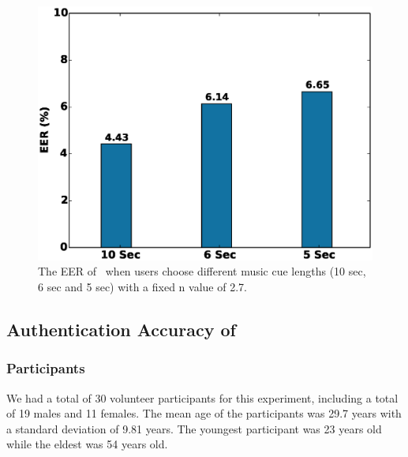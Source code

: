 
\begin{figure}[t]
\centering
\includegraphics [width=.75\columnwidth]{figure/exp2_eer_vary_length.eps}
\caption{The EER of \systemname~when users choose different music cue lengths (10 sec, 6 sec and 5
sec) with a fixed n value of 2.7.}
\label{fig:eer-length}
\vspace{-1mm}
\end{figure}




\subsection{Authentication Accuracy of \systemname}

\subsubsection{Participants}
We had a total of 30 volunteer participants for this experiment, including a total of 19 males and 11 females.
The mean age of the participants was 29.7 years with a standard deviation
of 9.81 years. The youngest participant was 23 years old while the eldest was
54 years old.


